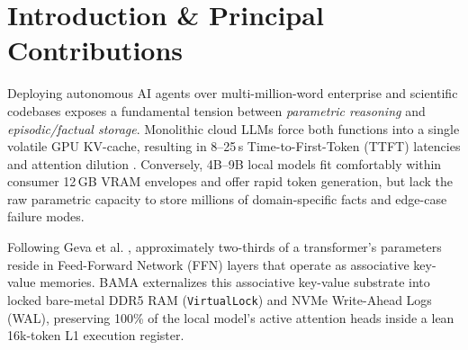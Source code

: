 \documentclass[10pt,twocolumn,letterpaper]{article}
\begin{document}
\begin{abstract}
(\texttt{@LUMEN} primed and 3-Model Dual-Seat Stack), with \texttt{5.64--19.92\,ms} (mean \texttt{10.52\,ms}) cortical arena routing and \texttt{2.05--32.50\,s} end-to-end turn verification.
\end{abstract}

\section{Introduction \& Principal Contributions}
Deploying autonomous AI agents over multi-million-word enterprise and scientific codebases exposes a fundamental tension between \textit{parametric reasoning} and \textit{episodic/factual storage}. Monolithic cloud LLMs force both functions into a single volatile GPU KV-cache, resulting in 8--25\,s Time-to-First-Token (TTFT) latencies and attention dilution \cite{liu2024lost}. Conversely, 4B--9B local models fit comfortably within consumer 12\,GB VRAM envelopes and offer rapid token generation, but lack the raw parametric capacity to store millions of domain-specific facts and edge-case failure modes.

Following Geva et al. \cite{geva2021transformer}, approximately two-thirds of a transformer's parameters reside in Feed-Forward Network (FFN) layers that operate as associative key-value memories. BAMA externalizes this associative key-value substrate into locked bare-metal DDR5 RAM (\texttt{VirtualLock}) and NVMe Write-Ahead Logs (WAL), preserving 100\% of the local model's active attention heads inside a lean 16k-token L1 execution register.
\end{document}
